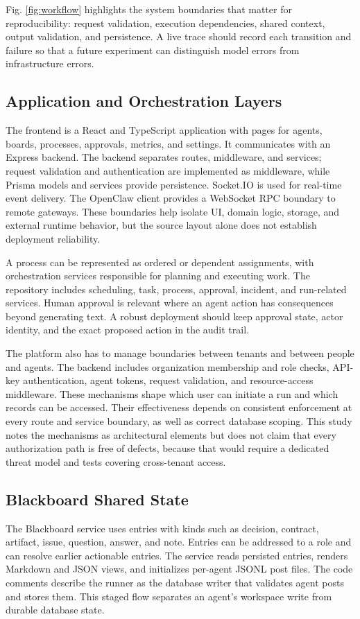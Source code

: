 \documentclass[12pt,onecolumn,draftclsnofoot]{IEEEtran}
\begin{document}
Fig. \ref{fig:workflow} highlights the system boundaries that matter for reproducibility: request validation, execution dependencies, shared context, output validation, and persistence. A live trace should record each transition and failure so that a future experiment can distinguish model errors from infrastructure errors.

\subsection{Application and Orchestration Layers}
The frontend is a React and TypeScript application with pages for agents, boards, processes, approvals, metrics, and settings. It communicates with an Express backend. The backend separates routes, middleware, and services; request validation and authentication are implemented as middleware, while Prisma models and services provide persistence. Socket.IO is used for real-time event delivery. The OpenClaw client provides a WebSocket RPC boundary to remote gateways. These boundaries help isolate UI, domain logic, storage, and external runtime behavior, but the source layout alone does not establish deployment reliability.

A process can be represented as ordered or dependent assignments, with orchestration services responsible for planning and executing work. The repository includes scheduling, task, process, approval, incident, and run-related services. Human approval is relevant where an agent action has consequences beyond generating text. A robust deployment should keep approval state, actor identity, and the exact proposed action in the audit trail.

The platform also has to manage boundaries between tenants and between people and agents. The backend includes organization membership and role checks, API-key authentication, agent tokens, request validation, and resource-access middleware. These mechanisms shape which user can initiate a run and which records can be accessed. Their effectiveness depends on consistent enforcement at every route and service boundary, as well as correct database scoping. This study notes the mechanisms as architectural elements but does not claim that every authorization path is free of defects, because that would require a dedicated threat model and tests covering cross-tenant access.

\subsection{Blackboard Shared State}
The Blackboard service uses entries with kinds such as decision, contract, artifact, issue, question, answer, and note. Entries can be addressed to a role and can resolve earlier actionable entries. The service reads persisted entries, renders Markdown and JSON views, and initializes per-agent JSONL post files. The code comments describe the runner as the database writer that validates agent posts and stores them. This staged flow separates an agent's workspace write from durable database state.
\end{document}
